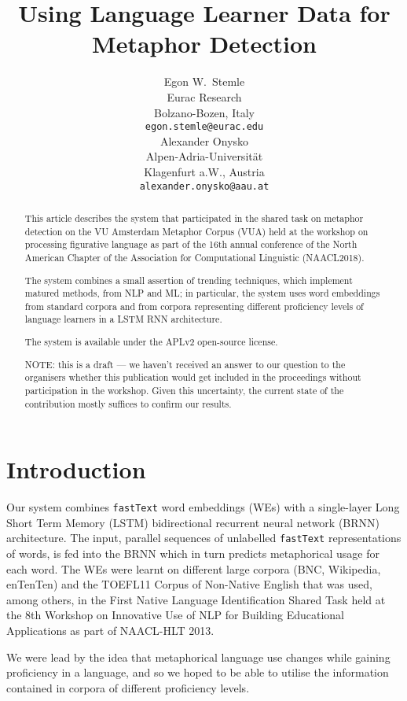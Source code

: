 \documentclass[11pt,a4paper]{article}
\title{Using Language Learner Data for Metaphor Detection}
\author{Egon W.~Stemle \\
  Eurac Research \\ 
  Bolzano-Bozen, Italy \\
  {\tt egon.stemle@eurac.edu} \\\And
  Alexander Onysko \\
  Alpen-Adria-Universität \\
  Klagenfurt a.W., Austria \\
  {\tt alexander.onysko@aau.at} \\}
\date{}
\newcommand\fT{\texttt{fastText}\xspace}
\begin{document}
\maketitle
\begin{abstract}
This article describes the system that participated in the shared task on metaphor detection on the VU Amsterdam Metaphor Corpus (VUA) held at the workshop on processing figurative language as part of the 16th annual conference of the North American Chapter of the Association for Computational Linguistic (NAACL2018).

The system combines a small assertion of trending techniques, which implement matured methods, from NLP and ML; in particular, the system uses word embeddings from standard corpora and from corpora representing different proficiency levels of language learners in a LSTM RNN architecture.

The system is available under the APLv2 open-source license.

NOTE: this is a draft --- we haven't received an answer to our question to the organisers whether this publication would get included in the proceedings without participation in the workshop. Given this uncertainty, the current state of the contribution mostly suffices to confirm our results.

\end{abstract}


\section{Introduction%
} %
\label{sec:intro}

Our system combines \fT \cite{bojanowski2016enriching} word embeddings (WEs) with a
single-layer Long Short Term Memory (LSTM) bidirectional recurrent neural network (BRNN)
architecture.
The input, parallel sequences of unlabelled \fT representations of words, is fed into the
BRNN which in turn predicts metaphorical usage for each word. The WEs were learnt on different large corpora (BNC, Wikipedia, enTenTen) and the TOEFL11 Corpus of Non-Native English\cite{ETS2:ETS202331} that was used, among others, in the First Native Language Identification Shared Task\cite{tetreault-blanchard-cahill:2013:BEA}
 held at the 8th Workshop on Innovative Use of NLP for Building Educational Applications as part of NAACL-HLT 2013.

We were lead by the idea that metaphorical language use changes while gaining proficiency in a language, and so we hoped to be able to utilise the information contained in corpora of different proficiency levels.
\end{document}
